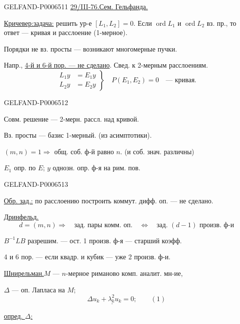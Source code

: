 \begin{GelfandAdjacentEvidence}{GELFAND-P000651}{1}
\underline{29/III-76.}\quad \underline{Сем. Гельфанда.}

\underline{Кричевер:}\quad \underline{задача:} решить ур-е \([L_1,L_2]=0\).
Если \(\operatorname{ord}L_1\) и \(\operatorname{ord}L_2\) вз. пр., то ответ --- кривая и расслоение
(1-мерное).

Порядки не вз. просты --- возникают многомерные пучки.

Напр., \underline{4-й и 6-й пор. --- не сделано}. Свед. к 2-мерным расслоениям.
\[
\left.\begin{aligned}
L_1y&=E_1y\\
L_2y&=E_2y
\end{aligned}\right\}
\quad P(E_1,E_2)=0\quad\text{--- кривая.}
\]
\end{GelfandAdjacentEvidence}
\begin{GelfandAdjacentEvidence}{GELFAND-P000651}{2}

Совм. решение --- 2-мерн. рассл. над кривой.

Вз. просты --- базис 1-мерный. (из асимптотики).

\((m,n)=1\Longrightarrow\) общ. соб. ф-й равно \(n\). (и соб. знач. различны)

\(E_1\) опр. по \(E\); \(y\) однозн. опр. ф-я на рим. пов.
\end{GelfandAdjacentEvidence}
\begin{GelfandAdjacentEvidence}{GELFAND-P000651}{3}


\underline{Обр. зад.:} по расслоению построить коммут. дифф. оп. --- не сделано.

\underline{Дринфельд.}
\[
d=(m,n)\Longrightarrow\quad
\text{зад. пары комм. оп.}\quad\Longleftrightarrow\quad
\text{зад. \((d-1)\) произв. ф-и}
\]

\(B^{-1}LB\) разрешим. --- ост. 1 произв. ф-я --- старший коэфф.

4 и 6 пор. --- если квадр. и кубик --- уже 2 произв. ф-и.

\underline{\underline{Шнирельман.}}\quad \(M\) --- \(n\)-мерное риманово комп. аналит. мн-ие,

\(\Delta\) --- оп. Лапласа на \(M\);
\[
\underline{\Delta u_k+\lambda_k^2u_k=0;}\qquad(1)
\]

\underline{опред. \(\Delta\):}
\end{GelfandAdjacentEvidence}
